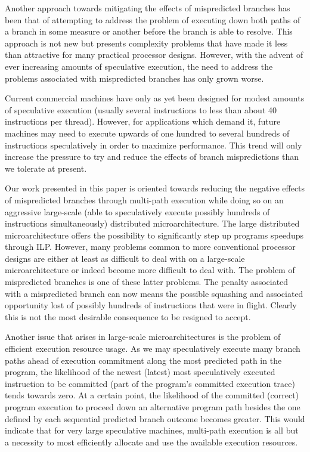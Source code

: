 \documentclass[10pt,dvips]{article}
\begin{document}
Another approach towards mitigating the effects of mispredicted branches
has been that of attempting to address the problem of executing
down both paths of a branch in some measure or another before the
branch is able to resolve.  This approach is not new but presents
complexity problems that have made it less than attractive for
many practical processor designs.  However, with the advent of ever
increasing amounts of speculative execution, the need to address
the problems associated with mispredicted branches has only grown worse.

Current commercial machines have only as yet been designed for modest
amounts of speculative execution (usually several instructions to 
less than about 40 instructions per thread).
However, for applications which demand it,
future machines may need to execute upwards of one hundred to
several hundreds of instructions speculatively in order to maximize
performance.  This trend will only increase the pressure to try
and reduce the effects of branch mispredictions than we tolerate
at present.

Our work presented in this paper is oriented towards reducing the
negative effects of mispredicted branches through multi-path execution
while doing so on an aggressive large-scale (able to speculatively execute
possibly hundreds of instructions simultaneously)
distributed
microarchitecture.  The large distributed microarchitecture offers the
possibility to significantly step up programs speedups through ILP.
However, many problems common to more conventional processor designs
are either at least as difficult to deal with on a large-scale
microarchitecture or indeed become more difficult to deal with.
The problem of mispredicted branches is one of these latter problems.
The penalty associated with a mispredicted branch can now means
the possible squashing and associated opportunity lost of possibly
hundreds of instructions that were in flight.  Clearly this
is not the most desirable consequence to be resigned to accept.

Another issue that arises in large-scale microarchitectures is the
problem of efficient execution resource usage.
As we may speculatively execute many branch paths ahead of execution
commitment along the most predicted path in the program, the likelihood
of the newest (latest) most speculatively executed instruction to
be committed (part of the program's committed execution trace) tends
towards zero.  At a certain point, the likelihood of the committed (correct)
program execution to proceed down an alternative program path
besides the one defined by each sequential predicted branch outcome
becomes greater.  This would indicate that for very large speculative
machines, multi-path execution is all but a necessity to most
efficiently allocate and use the available execution resources.
\end{document}
